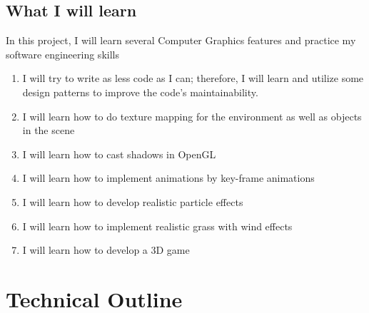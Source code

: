 \documentclass {article}
\begin{document}
	\subsection{What I will learn}
        In this project, I will learn several Computer Graphics features and practice my software engineering skills
        \begin{enumerate}
            \item I will try to write as less code as I can; therefore, I will learn and utilize some design patterns to improve the code's maintainability.
            \item I will learn how to do texture mapping for the environment as well as objects in the scene
            \item I will learn how to cast shadows in OpenGL
            \item I will learn how to implement animations by key-frame animations
            \item I will learn how to develop realistic particle effects
            \item I will learn how to implement realistic grass with wind effects
            \item I will learn how to develop a 3D game
        \end{enumerate}

\section{Technical Outline}
\end{document}
